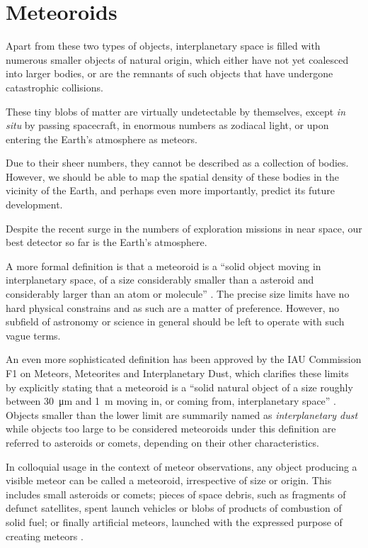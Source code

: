 \section{Meteoroids} \label{am}
    Apart from these two types of objects, interplanetary space is filled with numerous smaller objects
    of natural origin, which either have not yet coalesced into larger bodies, or are the remnants
    of such objects that have undergone catastrophic collisions.

    These tiny blobs of matter are virtually undetectable by themselves, except \textit{in situ} by passing spacecraft,
    in enormous numbers as zodiacal light, or upon entering the Earth's atmosphere as meteors.

    Due to their sheer numbers, they cannot be described as a collection of bodies.
    However, we should be able to map the spatial density of these bodies in the vicinity of the Earth,
    and perhaps even more importantly, predict its future development.

    Despite the recent surge in the numbers of exploration missions in near space,
    our best detector so far is the Earth's atmosphere.



    A more formal definition is that a meteoroid is a ``solid object moving in interplanetary space,
    of a size considerably smaller than a asteroid and considerably larger than an atom or molecule'' \citep{imo-glossary}.
    The precise size limits have no hard physical constrains and as such are a matter of preference.
    However, no subfield of astronomy or science in general should be left to operate with such vague terms.

    An even more sophisticated definition has been approved by the IAU Commission F1 on Meteors, Meteorites and Interplanetary Dust,
    which clarifies these limits by explicitly stating that a meteoroid is a ``solid natural object
    of a size roughly between \SI{30}{\micro\metre} and \SI{1}{\metre} moving in, or coming from, interplanetary space'' \citep{imo-definitions}.
    Objects smaller than the lower limit are summarily named as \emph{interplanetary dust} while objects
    too large to be considered meteoroids under this definition are referred to
    asteroids or comets, depending on their other characteristics.

    In colloquial usage in the context of meteor observations, any object producing a visible meteor can be called a meteoroid,
    irrespective of size or origin. This includes small asteroids or comets; pieces of space debris,
    such as fragments of defunct satellites, spent launch vehicles or blobs of products of combustion of solid fuel;
    or finally artificial meteors, launched with the expressed purpose of creating meteors \cite{japončíci}.

